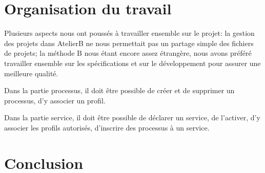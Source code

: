 \documentclass[french, titlepage, 10pt, a4paper]{article}
\begin{document}
\section{Organisation du travail}
Plusieurs aspects nous ont poussés à travailler ensemble sur le projet: la
gestion des projets dans AtelierB ne nous permettait pas un partage simple des
fichiers de projets; la méthode B nous étant encore assez étrangère, nous avons
préféré travailler ensemble sur les spécifications et sur le développement pour
assurer une meilleure qualité.

Dans la partie processus, il doit être possible de créer et de supprimer un
processus, d'y associer un profil.

Dans la partie service, il doit être possible de déclarer un service, de
l'activer, d'y associer les profils autorisés, d'inscrire des processus à un
service.

\section{Conclusion}
\end{document}
